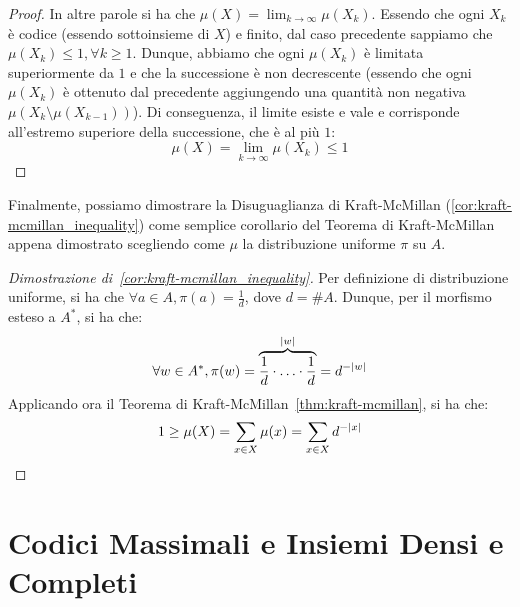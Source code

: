 \begin{proof}
  In altre parole si ha che \(\mu(X) = \lim_{k \to \infty} \mu(X_k)\). Essendo che ogni \(X_k\) è codice (essendo sottoinsieme di \(X\)) e finito, dal caso precedente sappiamo che \(\mu(X_k) \leq 1, \forall k \geq 1\).
  Dunque, abbiamo che ogni \(\mu(X_k)\) è limitata superiormente da \(1\) e che la successione è non decrescente (essendo che ogni \(\mu(X_k)\) è ottenuto dal precedente aggiungendo una quantità non negativa \(\mu(X_{k}\setminus\mu(X_{k-1}))\)). 
  Di conseguenza, il limite esiste e vale e corrisponde all'estremo superiore della successione, che è al più \(1\):
  \[\mu(X) = \lim_{k \to \infty} \mu(X_k) \leq 1\]
\end{proof}

Finalmente, possiamo dimostrare la Disuguaglianza di Kraft-McMillan (\ref{cor:kraft-mcmillan_inequality}) come semplice corollario del Teorema di Kraft-McMillan appena dimostrato scegliendo come \(\mu\) la distribuzione uniforme \(\pi\) su \(A\).

\begin{proof}[Dimostrazione di~\ref{cor:kraft-mcmillan_inequality}]
  Per definizione di distribuzione uniforme, si ha che \(\forall a \in A, \pi(a) = \frac{1}{d}\), dove \(d = \# A\).
  Dunque, per il morfismo esteso a \(A^*\), si ha che:
  \begin{equation*}
    \forall w \in A^*, \pi(w) = \overbrace{\frac{1}{d}\cdot\ldots\cdot\frac{1}{d}}^{\left|w\right|} = d^{-\lvert w\rvert}
  \end{equation*}
  Applicando ora il Teorema di Kraft-McMillan~\ref{thm:kraft-mcmillan}, si ha che:
  \[1 \geq\mu(X) = \sum_{x \in X} \mu(x) = \sum_{x \in X} d^{-\left|x\right|}\]
  
\end{proof}

\section{Codici Massimali e Insiemi Densi e Completi}

